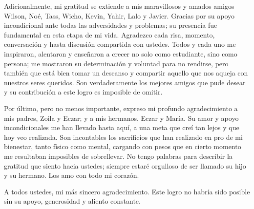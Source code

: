 Adicionalmente, mi gratitud se extiende a mis maravillosos y amados amigos Wilson, Noé, Tass, Wicho, Kevin, Yahir, Lalo y Javier. Gracias por su apoyo incondicional ante todas las adversidades y problemas; su presencia fue fundamental en esta etapa de mi vida. Agradezco cada risa, momento, conversación y hasta discusión compartida con ustedes. Todos y cada uno me inspiraron, alentaron y enseñaron a crecer no solo como estudiante, sino como persona; me mostraron su determinación y voluntad para no rendirse, pero también que está bien tomar un descanso y compartir aquello que nos aqueja con nuestros seres queridos. Son verdaderamente los mejores amigos que pude desear y su contribución a este logro es imposible de omitir.

Por último, pero no menos importante, expreso mi profundo agradecimiento a mis padres, Zoila y Eczar; y a mis hermanos, Eczar y María. Su amor y apoyo incondicionales me han llevado hasta aquí, a una meta que creí tan lejos y que hoy veo realizada. Son incontables los sacrificios que han realizado en pro de mi bienestar, tanto físico como mental, cargando con pesos que en cierto momento me resultaban imposibles de sobrellevar. No tengo palabras para describir la gratitud que siento hacia ustedes; siempre estaré orgulloso de ser llamado su hijo y su hermano. Los amo con todo mi corazón.

A todos ustedes, mi más sincero agradecimiento. Este logro no habría sido posible sin su apoyo, generosidad y aliento constante.